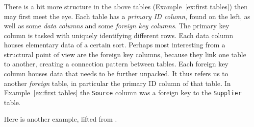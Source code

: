 \documentclass[../main/CT4S-EN-RU]{subfiles}
\begin{document}
\begin{exampleRUS}\label{ex:graphene}
\end{exampleRUS}


\subsubsection{}

\begin{blockENG}
There is a bit more structure in the above tables (Example~\ref{ex:first tables}) then may first meet the eye. Each table has a {\em primary ID column}, found on the left, as well as some {\em data columns} and some {\em foreign key columns}. The primary key column is tasked with uniquely identifying different rows. Each data column houses elementary data of a certain sort. Perhaps most interesting from a structural point of view are the foreign key columns, because they link one table to another, creating a connection pattern between tables. Each foreign key column houses data that needs to be further unpacked. It thus refers us to another {\em foreign} table, in particular the primary ID column of that table. In Example~\ref{ex:first tables} the {\tt Source} column was a foreign key to the {\tt Supplier} table.
\end{blockENG}

\begin{blockRUS}
\end{blockRUS}

\begin{blockENG}
Here is another example, lifted from \cite{Sp2}.
\end{blockENG}

\begin{blockRUS}
\end{blockRUS}
\end{document}
